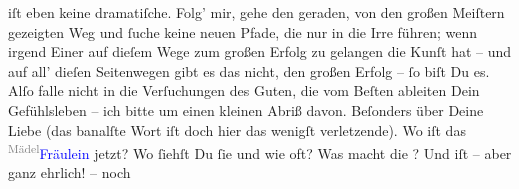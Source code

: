                iſt eben keine dramatiſche. Folg’ mir, gehe den geraden, von den großen Meiſtern
               gezeigten Weg und ſuche keine neuen Pfade, die nur in die Irre führen; wenn irgend
               Einer auf dieſem Wege zum großen Erfolg zu gelangen die Kunſt hat – und auf all’
               dieſen Seitenwegen gibt es das nicht, den großen Erfolg – ſo biſt Du es. Alſo falle
               nicht in {\pb}die Verſuchungen des Guten, die vom Beſten
                  ableiten{\dotsfive}\pend
           \pstart
           Dein Gefühlsleben – ich bitte um einen kleinen Abriß
               davon. Beſonders über Deine Liebe (das banalſte Wort iſt doch hier das wenigſt
               verletzende). Wo iſt das \substVorne{}\textsuperscript{\textcolor{gray}{Mädel}}\substDazwischen{}\textcolor{blue}{Fräulein}{}\substHinten{} jetzt? Wo ſiehſt Du ſie und wie oft? Was macht die \label{K_L02668-44v}\label{K_L02668-44h}? Und iſt – aber ganz ehrlich! – noch
